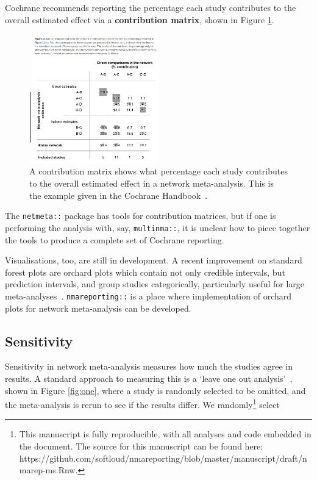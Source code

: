 \documentclass[12pt]{article}\usepackage[]{graphicx}\usepackage[]{color}
\newcommand{\package}[1]{\texttt{{#1::}}}
\begin{document}
Cochrane recommends reporting the percentage each study contributes to the overall estimated effect via a \textbf{contribution matrix}, shown in Figure \ref{fig:cmatrix}.

\begin{figure}
\centering
\includegraphics[width=0.5\textwidth]{contribution-matrix}
\caption{A contribution matrix shows what percentage each study contributes to the overall estimated effect in a network meta-analysis. This is the example given in the Cochrane Handbook~\cite{higgins2019cochrane}.}
\label{fig:cmatrix}
\end{figure}

The \package{netmeta} package has tools for contribution matrices, but if one is performing the analysis with, say, \package{multinma}, it is unclear how to piece together the tools to produce a complete set of Cochrane reporting.

Visualisations, too, are still in development. A recent improvement on standard forest plots are orchard plots which contain not only credible intervals, but prediction intervals, and group studies categorically, particularly useful for large meta-analyses~\cite{nakagawa_orchard_2021}. \package{nmareporting} is a place where implementation of orchard plots for network meta-analysis can be developed.

\subsection{Sensitivity}





Sensitivity in network meta-analysis measures how much the studies agree in results. A standard approach to measuring this is a `leave one out analysis'~\cite{borenstein_introduction_2011}, shown in Figure \ref{fig:one}, where a study is randomly selected to be omitted, and the meta-analysis is rerun to see if the results differ. We randomly\footnote{
This manuscript is fully reproducible, with all analyses and code embedded in the document. The source for this manuscript can be found here: https://github.com/softloud/nmareporting/blob/master/manuscript/draft/nmarep-ms.Rnw.
} select
\end{document}
